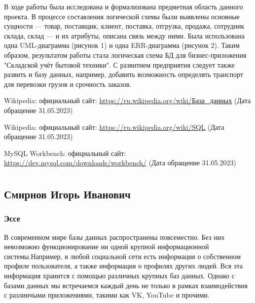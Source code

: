 \documentclass[14pt]{extreport}
\begin{document}
\conclusions

В ходе работы была исследована и формализована предметная область данного проекта. В процессе составления логической схемы были выявлены основные сущности — товар, поставщик, клиент, поставка, отгрузка, продажа, сотрудник склада, склад — и их атрибуты, описана связь между ними. Была использована одна UML-диаграмма (рисунок 1) и одна ERR-диаграмма (рисунок 2). Таким образом, результатом работы стала логическая схема БД для бизнес-приложения "Складской учёт бытовой техники". С развитием предприятия следует также развить и базу данных, например, добавить возможность определять транспорт для перевозки грузов и срочность заказов.


\begin{thebibliography}

 Wikipedia: официальный сайт: 
\url{https://ru.wikipedia.org/wiki/База_данных} (Дата обращение 31.05.2023)

 Wikipedia: официальный сайт: \url{https://ru.wikipedia.org/wiki/SQL} (Дата обращение 31.05.2023)

 MySQL Workbench: официальный сайт: \url{https://dev.mysql.com/downloads/workbench/} (Дата обращение 31.05.2023)

\end{thebibliography}

\appendix
\chapter{}
\section{Смирнов Игорь Иванович}

\subsection{Эссе}

В современном мире базы данных распространены повсеместно. Без них
невозможно функционирование ни одной крупной информационной системы.Например, в любой социальной сети есть информация о собственном профиле пользователя, а также информация о профилях других людей. Вся эта информация хранится с помощью различных крупных баз данных. Однако с базами данных мы встречаемся каждый день не только в рамках взаимодействия с разлинчыми приложениями, такими как VK, YouTube и прочими.
\end{document}

